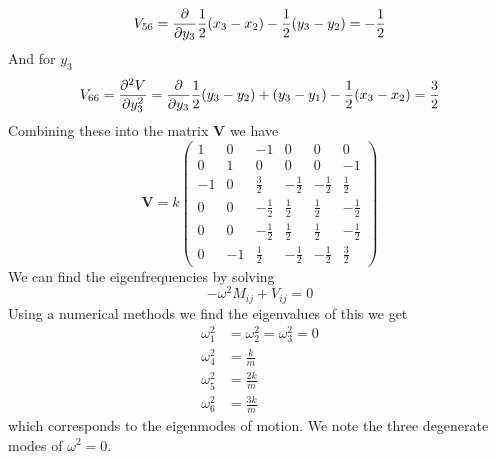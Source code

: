 \documentclass[11pt]{article}
\numberwithin{equation}{section}
\begin{document}
\begin{enumerate}[(a)]
\begin{align*}
V_{56} &= \frac{\partial{}}{\partial{y_3}}\frac{1}{2}(x_3-x_2)-\frac{1}{2}(y_3-y_2) = -\frac{1}{2}\\
\end{align*}
And for $y_3$
$$V_{66} = \frac{\partial{^2V}}{\partial{y_3^2}} = \frac{\partial{}}{\partial{y_3}}\frac{1}{2}(y_3-y_2)+(y_3-y_1)-\frac{1}{2}(x_3-x_2) = \frac{3}{2}$$
Combining these into the matrix $\mathbf{V}$ we have
$$\mathbf{V} = k\left(\begin{array}{cccccc}
 1 & 0 & -1 & 0 & 0 & 0 \\
 0 & 1 & 0 & 0 & 0 & -1 \\
 -1 & 0 & \frac{3}{2} & -\frac{1}{2} & -\frac{1}{2} & \frac{1}{2} \\
 0 & 0 & -\frac{1}{2} & \frac{1}{2} & \frac{1}{2} & -\frac{1}{2} \\
 0 & 0 & -\frac{1}{2} & \frac{1}{2} & \frac{1}{2} & -\frac{1}{2} \\
 0 & -1 & \frac{1}{2} & -\frac{1}{2} & -\frac{1}{2} & \frac{3}{2} 
\end{array}\right)$$
We can find the eigenfrequencies by solving
$$-\omega^2M_{ij}+V_{ij}=0$$
Using a numerical methods we find the eigenvalues of this we get
\begin{align*}
\omega_1^2 &= \omega_2^2 = \omega_3^2 = 0\\
\omega_4^2 &= \frac{k}{m}\\
\omega_5^2 &= \frac{2k}{m}\\
\omega_6^2 &= \frac{3k}{m}
\end{align*}
which corresponds to the eigenmodes of motion. We note the three degenerate modes of 
$\omega^2=0$.


\end{enumerate}
\end{document}
